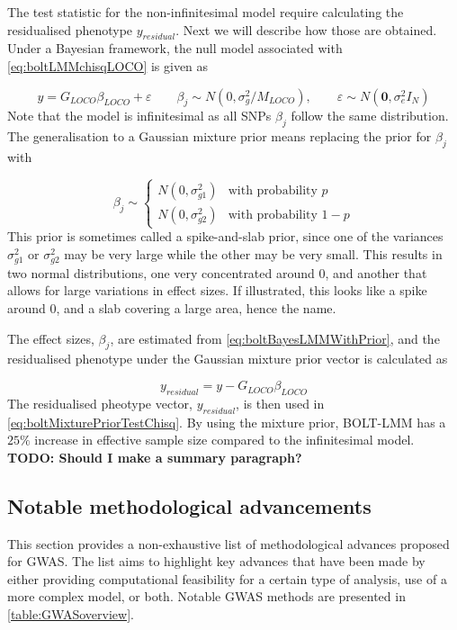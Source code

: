 The test statistic for the non-infinitesimal model require calculating the residualised phenotype $ y_{residual} $. Next we will describe how those are obtained. Under a Bayesian framework, the null model associated with \cref{eq:boltLMMchisqLOCO} is given as

\begin{equation}\label{eq:boltBayesLMMWithPrior}
y = G_{LOCO} \beta_{LOCO} + \varepsilon \qquad \beta_j \sim N(0, \sigma^2_g /M_{LOCO}), \qquad \varepsilon \sim N(\mathbf{0},\sigma_e^2I_N)
\end{equation}
Note that the model is infinitesimal as all SNPs $ \beta_j $ follow the same distribution. The generalisation to a Gaussian mixture prior means replacing the prior for $ \beta_j $ with 

\begin{equation}
\beta_j \sim
\begin{cases}
N(0, \sigma^2_{g1}) & \text{with probability } p \\
N(0, \sigma^2_{g2}) & \text{with probability } 1-p
\end{cases}
\end{equation}
This prior is sometimes called a spike-and-slab prior, since one of the variances $ \sigma^2_{g1} $ or $  \sigma^2_{g2} $ may be very large while the other may be very small. This results in two normal distributions, one very concentrated around $ 0 $, and another that allows for large variations in effect sizes. If illustrated, this looks like a spike around $ 0 $, and a slab covering a large area, hence the name.

The effect sizes, $ \beta_j $, are estimated from \cref{eq:boltBayesLMMWithPrior}, and the residualised phenotype under the Gaussian mixture prior vector is calculated as

\begin{equation}
y_{residual} = y - G_{LOCO}\beta_{LOCO}
\end{equation}
The residualised pheotype vector, $ y_{residual} $, is then used in \cref{eq:boltMixturePriorTestChisq}. By using the mixture prior, BOLT-LMM has a $ 25\% $ increase in effective sample size compared to the infinitesimal model.
\textbf{TODO: Should I make a summary paragraph?}


\subsection{Notable methodological advancements}
This section provides a non-exhaustive list of methodological advances proposed for GWAS. The list aims to highlight key advances that have been made by either providing computational feasibility for a certain type of analysis, use of a more complex model, or both. Notable GWAS methods are presented in \cref{table:GWASoverview}. 

